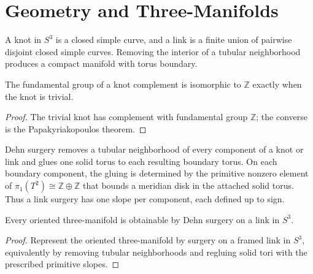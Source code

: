 \chapter{Geometry and Three-Manifolds}

\begin{definition}
\label{thurston-ch01-knot-link}

A knot in $S^3$ is a closed simple curve, and a link is a finite union of pairwise disjoint closed simple curves.  Removing the interior of a tubular neighborhood produces a compact manifold with torus boundary.
\end{definition}

\begin{proposition}
\label{thurston-ch01-knot-complement-group}

The fundamental group of a knot complement is isomorphic to $\mathbb Z$ exactly when the knot is trivial.
\end{proposition}
\begin{proof}
\sketch
The trivial knot has complement with fundamental group $\mathbb Z$; the converse is the Papakyriakopoulos theorem.
\end{proof}

\begin{definition}
\label{thurston-ch01-dehn-surgery}

Dehn surgery removes a tubular neighborhood of every component of a knot or link and glues one solid torus to each resulting boundary torus.  On each boundary component, the gluing is determined by the primitive nonzero element of $\pi_1(T^2)\cong\mathbb Z\oplus\mathbb Z$ that bounds a meridian disk in the attached solid torus.  Thus a link surgery has one slope per component, each defined up to sign.
\end{definition}

\begin{theorem}
\label{thurston-ch01-surgery-presentation}

Every oriented three-manifold is obtainable by Dehn surgery on a link in $S^3$.
\end{theorem}
\begin{proof}
\sketch
Represent the oriented three-manifold by surgery on a framed link in $S^3$, equivalently by removing tubular neighborhoods and regluing solid tori with the prescribed primitive slopes.
\end{proof}


